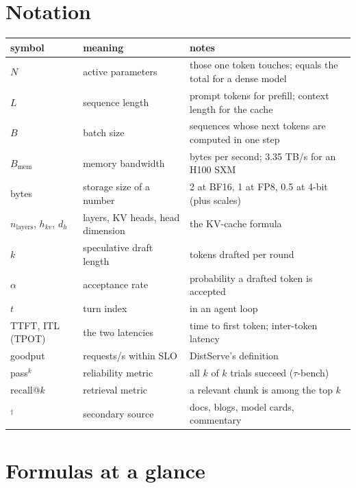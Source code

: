 \documentclass[11pt,letterpaper]{article}
\newcommand{\bw}{B_{\mathrm{mem}}}
\begin{document}
\section{Notation}

\begin{center}\footnotesize\setlength{\tabcolsep}{4pt}
\begin{tabular}{@{}lp{4.3cm}p{6.7cm}@{}}
\toprule
symbol & meaning & notes\\
\midrule
$N$ & active parameters & those one token touches; equals the total for a dense model\\
$L$ & sequence length & prompt tokens for prefill; context length for the cache\\
$B$ & batch size & sequences whose next tokens are computed in one step\\
$\bw$ & memory bandwidth & bytes per second; 3.35 TB/s for an H100 SXM\\
bytes & storage size of a number & 2 at BF16, 1 at FP8, 0.5 at 4-bit (plus scales)\\
$n_{\text{layers}}$, $h_{kv}$, $d_h$ & layers, KV heads, head dimension & the KV-cache formula\\
$k$ & speculative draft length & tokens drafted per round\\
$\alpha$ & acceptance rate & probability a drafted token is accepted\\
$t$ & turn index & in an agent loop\\
TTFT, ITL (TPOT) & the two latencies & time to first token; inter-token latency\\
goodput & requests/s within SLO & DistServe's definition\\
pass$^k$ & reliability metric & all $k$ of $k$ trials succeed ($\tau$-bench)\\
recall@$k$ & retrieval metric & a relevant chunk is among the top $k$\\
$^\dagger$ & secondary source & docs, blogs, model cards, commentary\\
\bottomrule
\end{tabular}
\end{center}

\clearpage
\section{Formulas at a glance}
\end{document}
